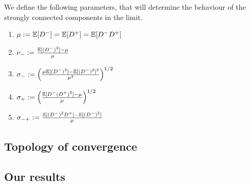 We define the following parameters, that will determine the behaviour of the strongly connected components in the limit.
\begin{enumerate}
    \item $\mu:={\mathbb E}[D^-]={\mathbb E}[D^+]={\mathbb E}[D^-D^+]$
    \item $\nu_-:=\frac{{\mathbb E}[(D^-)^2]-\mu}{\mu}$ 
    \item $\sigma_-:=\left(\frac{\mu{\mathbb E}[(D^-)^3]-{\mathbb E}[(D^-)^2]^2}{\mu^2}\right)^{1/2}$ 
    \item $\sigma_+:=\left(\frac{{\mathbb E}[D^-(D^+)^2]-\mu}{\mu}\right)^{1/2}$ 
    \item $\sigma_{-+}:=\frac{{\mathbb E}[(D^-)^2D^+]-{\mathbb E}[(D^-)^2]}{\mu}$ 
\end{enumerate}
\subsection{Topology of convergence}




\subsection{Our results}

